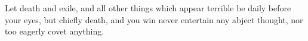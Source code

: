 Let death and exile, and all other things which appear terrible be daily before
your eyes, but  chiefly death, and you win never  entertain any abject thought,
nor too eagerly covet anything.
